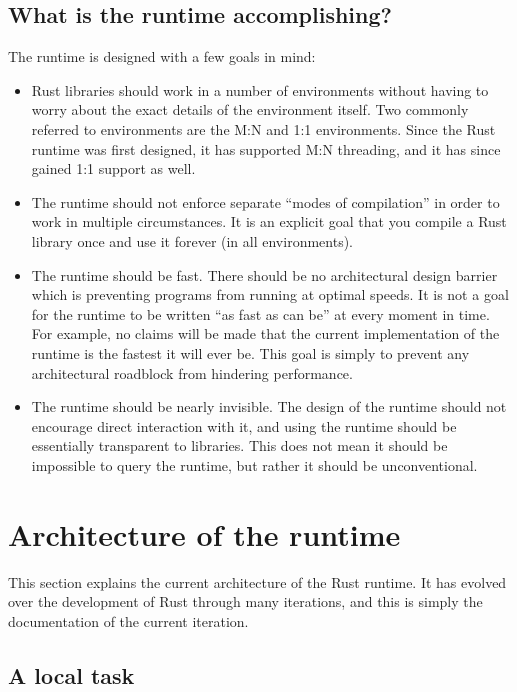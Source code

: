 \documentclass[]{article}
\begin{document}
\subsection{What is the runtime
accomplishing?}\label{what-is-the-runtime-accomplishing}

The runtime is designed with a few goals in mind:

\begin{itemize}
\item
  Rust libraries should work in a number of environments without having
  to worry about the exact details of the environment itself. Two
  commonly referred to environments are the M:N and 1:1 environments.
  Since the Rust runtime was first designed, it has supported M:N
  threading, and it has since gained 1:1 support as well.
\item
  The runtime should not enforce separate ``modes of compilation'' in
  order to work in multiple circumstances. It is an explicit goal that
  you compile a Rust library once and use it forever (in all
  environments).
\item
  The runtime should be fast. There should be no architectural design
  barrier which is preventing programs from running at optimal speeds.
  It is not a goal for the runtime to be written ``as fast as can be''
  at every moment in time. For example, no claims will be made that the
  current implementation of the runtime is the fastest it will ever be.
  This goal is simply to prevent any architectural roadblock from
  hindering performance.
\item
  The runtime should be nearly invisible. The design of the runtime
  should not encourage direct interaction with it, and using the runtime
  should be essentially transparent to libraries. This does not mean it
  should be impossible to query the runtime, but rather it should be
  unconventional.
\end{itemize}

\section{Architecture of the runtime}\label{architecture-of-the-runtime}

This section explains the current architecture of the Rust runtime. It
has evolved over the development of Rust through many iterations, and
this is simply the documentation of the current iteration.

\subsection{A local task}\label{a-local-task}
\end{document}
